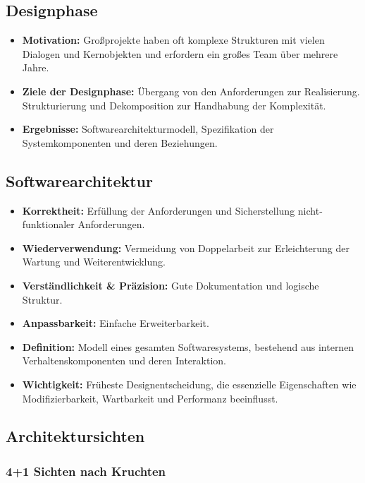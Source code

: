 \documentclass[11pt, a4paper]{article}
\begin{document}
\raggedright \subsection{Designphase}
\begin{itemize}
    \item \textbf{Motivation:} Großprojekte haben oft komplexe Strukturen mit vielen Dialogen und Kernobjekten und erfordern ein großes Team über mehrere Jahre.
    \item \textbf{Ziele der Designphase:} Übergang von den Anforderungen zur Realisierung. Strukturierung und Dekomposition zur Handhabung der Komplexität.
    \item \textbf{Ergebnisse:} Softwarearchitekturmodell, Spezifikation der Systemkomponenten und deren Beziehungen.
\end{itemize}

\subsection{Softwarearchitektur}
\begin{itemize}
    \item \textbf{Korrektheit:} Erfüllung der Anforderungen und Sicherstellung nicht-funktionaler Anforderungen.
    \item \textbf{Wiederverwendung:} Vermeidung von Doppelarbeit zur Erleichterung der Wartung und Weiterentwicklung.
    \item \textbf{Verständlichkeit \& Präzision:} Gute Dokumentation und logische Struktur.
    \item \textbf{Anpassbarkeit:} Einfache Erweiterbarkeit.
\end{itemize}

\begin{itemize}
    \item \textbf{Definition:} Modell eines gesamten Softwaresystems, bestehend aus internen Verhaltenskomponenten und deren Interaktion.
    \item \textbf{Wichtigkeit:} Früheste Designentscheidung, die essenzielle Eigenschaften wie Modifizierbarkeit, Wartbarkeit und Performanz beeinflusst.
\end{itemize}

\newpage

\subsection{Architektursichten}

\subsubsection{4+1 Sichten nach Kruchten}
\end{document}

